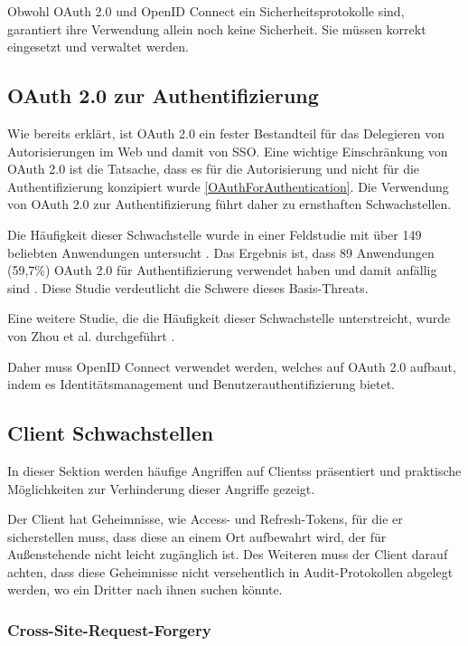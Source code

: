 Obwohl OAuth 2.0 und OpenID Connect ein Sicherheitsprotokolle sind, garantiert ihre Verwendung allein noch keine Sicherheit. Sie müssen korrekt eingesetzt und verwaltet werden.

\subsection{OAuth 2.0 zur Authentifizierung}

Wie bereits erklärt, ist OAuth 2.0 ein fester Bestandteil für das Delegieren von Autorisierungen im Web und damit von SSO. Eine wichtige Einschränkung von OAuth 2.0 ist die Tatsache, dass es für die Autorisierung und nicht für die Authentifizierung konzipiert wurde \ref{OAuthForAuthentication}. Die Verwendung von OAuth 2.0 zur Authentifizierung führt daher zu ernsthaften Schwachstellen.

Die Häufigkeit dieser Schwachstelle wurde in einer Feldstudie mit über 149 beliebten Anwendungen untersucht \cite{chen2014oauth}. Das Ergebnis ist, dass 89 Anwendungen (59,7\%) OAuth 2.0 für Authentifizierung verwendet haben und damit anfällig sind \cite{chen2014oauth}. Diese Studie verdeutlicht die Schwere dieses Basis-Threats.

Eine weitere Studie, die die Häufigkeit dieser Schwachstelle unterstreicht, wurde von Zhou et al. durchgeführt \cite{184435}.


Daher muss OpenID Connect verwendet werden, welches auf OAuth 2.0 aufbaut, indem es Identitätsmanagement und Benutzerauthentifizierung bietet.

\subsection{Client Schwachstellen}

In dieser Sektion werden häufige Angriffen auf Clientss präsentiert und praktische Möglichkeiten zur Verhinderung dieser Angriffe gezeigt.

Der Client hat Geheimnisse, wie Access- und Refresh-Tokens, für die er sicherstellen muss, dass diese an einem Ort aufbewahrt wird, der für Außenstehende nicht leicht zugänglich ist. Des Weiteren muss der Client darauf achten, dass diese Geheimnisse nicht versehentlich in Audit-Protokollen abgelegt werden, wo ein Dritter nach ihnen suchen könnte.

\subsubsection{Cross-Site-Request-Forgery}

